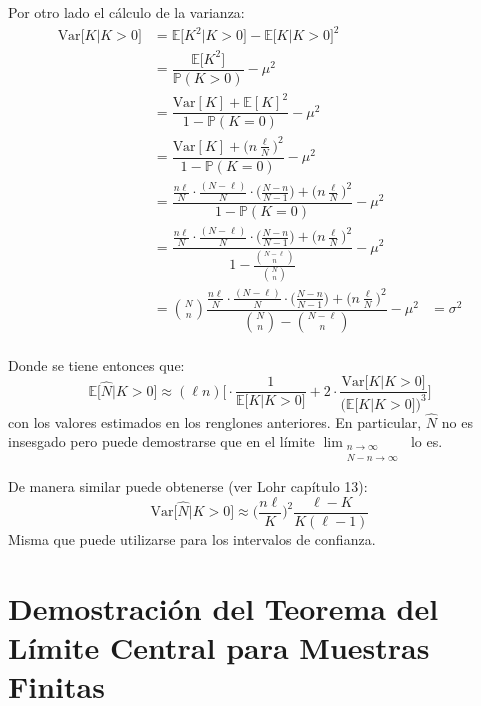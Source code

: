 \documentclass[
]{book}
\begin{document}
Por otro lado el cálculo de la varianza:
\begin{equation}\nonumber
\begin{aligned}
 \text{Var}\big[K | K > 0\big] & =\mathbb{E}\big[K^2 | K > 0] - \mathbb{E}\big[K | K > 0]^2\\
 & =  \dfrac{\mathbb{E}\big[K^2]}{\mathbb{P}(K > 0)} - \mu^2 \\
 & =  \dfrac{\text{Var}[K] + \mathbb{E}[K]^2}{1 - \mathbb{P}(K = 0)} - \mu^2 \\
 & = \dfrac{\text{Var}[K] + \Big(n\frac{\ell}{N}\Big)^2}{1 - \mathbb{P}(K = 0)} - \mu^2\\
 & = \dfrac{\frac{n\ell}{N} \cdot \frac{(N-\ell)}{N} \cdot \Big( \frac{N-n}{N-1} \Big) + \Big(n\frac{\ell}{N}\Big)^2}{1 - \mathbb{P}(K = 0)} - \mu^2 \\
 & = \dfrac{\frac{n\ell}{N} \cdot \frac{(N-\ell)}{N} \cdot \Big( \frac{N-n}{N-1} \Big) + \Big(n\frac{\ell}{N}\Big)^2}{1 -  \frac{\binom{N-\ell}{n}}{\binom{N}{n}}} - \mu^2 \\
 & = \binom{N}{n} \dfrac{\frac{n\ell}{N} \cdot \frac{(N-\ell)}{N} \cdot \Big( \frac{N-n}{N-1} \Big) + \Big(n\frac{\ell}{N}\Big)^2}{\binom{N}{n} -  \binom{N-\ell}{n}}- \mu^2 & = \sigma^2\\
\end{aligned}
\end{equation}

Donde se tiene entonces que:
\[
\mathbb{E}\big[ \hat{N} | K > 0\big] \approx (\ell n) \Bigg[ \cdot \dfrac{1}{\mathbb{E}\big[ K | K > 0]} + 2 \cdot \dfrac{\text{Var}\big[K | K > 0\big] }{\big(\mathbb{E}\big[ K | K > 0]\big)^3} \Bigg]
\]
con los valores estimados en los renglones anteriores. En particular, \(\hat{N}\) no es insesgado pero puede demostrarse que en el límite \(\lim_{\substack{n \to \infty \\ N-n\to\infty}}\) lo es.

De manera similar puede obtenerse (ver Lohr capítulo 13):
\[
\text{Var}\big[ \hat{N} | K > 0\big]\approx \Big(\dfrac{n \ell}{K}\Big)^2 \dfrac{\ell - K}{K(\ell - 1)}
\]
Misma que puede utilizarse para los intervalos de confianza.

\hypertarget{demostraciuxf3n-del-teorema-del-luxedmite-central-para-muestras-finitas}{%
\section{Demostración del Teorema del Límite Central para Muestras Finitas}\label{demostraciuxf3n-del-teorema-del-luxedmite-central-para-muestras-finitas}}
\end{document}
